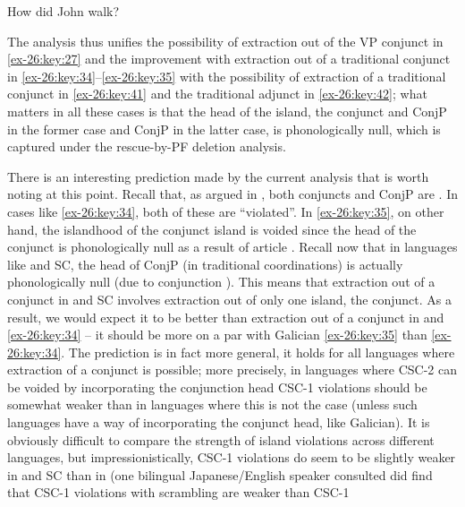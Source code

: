 \documentclass[output=paper]{langsci/langscibook}
\begin{document}
\ea\label{ex-26:key:42} How did John walk?
\z

The analysis thus unifies the possibility of extraction out of the VP conjunct
in \eqref{ex-26:key:27} and the improvement with extraction out of a traditional conjunct in
\eqref{ex-26:key:34}--\eqref{ex-26:key:35} with the possibility of extraction of a traditional conjunct in \eqref{ex-26:key:41}
and the traditional adjunct in \eqref{ex-26:key:42}; what matters in all these cases is that
the head of the island, the conjunct and ConjP in the former case and ConjP in
the latter case, is phonologically null, which is captured under the
rescue-by-\gls{PF} deletion analysis.

There is an interesting prediction made by the current analysis that is worth
noting at this point. Recall that, as argued in \textcite{Odainpress}, both conjuncts
and ConjP are . In cases like  \eqref{ex-26:key:34}, both of these  are
“violated”. In \eqref{ex-26:key:35}, on other hand, the islandhood of the conjunct island is
voided since the head of the conjunct is phonologically null as a result of
article . Recall now that in languages like  and \gls{SC}, the
head of ConjP (in traditional coordinations) is actually phonologically null
(due to conjunction ). This means that extraction out of a
conjunct in  and \gls{SC} involves extraction out of only one island,
the conjunct. As a result, we would expect it to be better than extraction out
of a conjunct in  and  \eqref{ex-26:key:34} – it should be more on a par with
Galician \eqref{ex-26:key:35} than  \eqref{ex-26:key:34}. The prediction is in fact more general, it
holds for all languages where extraction of a conjunct is possible; more
precisely, in languages where CSC-2 can be voided by incorporating the
conjunction head CSC-1 violations should be somewhat weaker than in languages
where this is not the case (unless such languages have a way of incorporating
the conjunct head, like Galician). It is obviously difficult to compare the
strength of island violations across different languages, but
impressionistically, CSC-1 violations do seem to be slightly weaker in 
and \gls{SC} than in  (one bilingual Japanese/English speaker consulted
did find that CSC-1 violations with  scrambling are weaker than CSC-1
\end{document}
